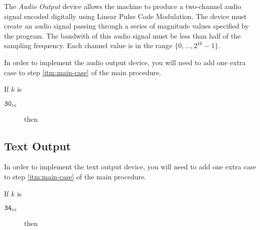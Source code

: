 \documentclass[a4paper,12pt]{article}
\newcommand{\num}[1]{\texttt{#1}}
\newcommand{\hex}[1]{\num{#1}_{\textup{\tiny 16}}}
\newcommand{\range}[2]{\{#1,\ldots,#2\}}
\newcommand{\proc}[1]{\textsc{#1}}
\newcommand{\op}[1]{$#1$}
\newcommand{\NEWFRAME}  [1]{\op{\hex{30}}}
\newcommand{\PUTCHAR}   [1]{\op{\hex{34}}}
\begin{document}
The \emph{Audio Output} device allows the machine to produce a two-channel audio signal encoded digitally using Linear Pulse Code Modulation.
The device must create an audio signal passing through a series of magnitude values specified by the program.
The bandwith of this audio signal must be less than half of the sampling frequency.
Each channel value is in the range $\range{0}{2^{16}-1}$.

In order to implement the audio output device, you will need to add one extra case to step \ref{itm:main-case} of the main procedure.

\begin{stepnumbers}[start=3]
\item If $k$ is
  \begin{description}
  \item[\NEWFRAME{}] then
  \end{description}
\end{stepnumbers}

\subsection{Text Output}

In order to implement the text output device, you will need to add one extra case to step \ref{itm:main-case} of the main procedure.

\begin{stepnumbers}[start=3]
  \setcounter{enumi}{2}
\item If $k$ is
  \begin{description}
  \item[\PUTCHAR{}] then
  \end{description}
\end{stepnumbers}
\end{document}

